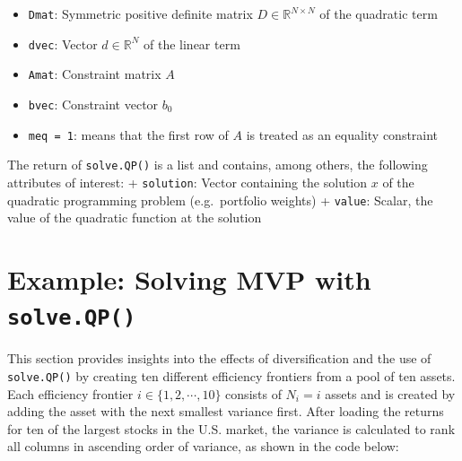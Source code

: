 \documentclass[
  oneside]{book}
\providecommand{\tightlist}{%
  \setlength{\itemsep}{0pt}\setlength{\parskip}{0pt}}
\begin{document}
\vspace{-0.4cm}

\begin{itemize}
\tightlist
\item
  \texttt{Dmat}: Symmetric positive definite matrix \(D \in \mathbb{R}^{N \times N}\) of the quadratic term
\item
  \texttt{dvec}: Vector \(d \in \mathbb{R}^{N}\) of the linear term
\item
  \texttt{Amat}: Constraint matrix \(A\)
\item
  \texttt{bvec}: Constraint vector \(b_0\)
\item
  \texttt{meq\ =\ 1}: means that the first row of \(A\) is treated as an equality constraint
\end{itemize}

The return of \texttt{solve.QP()} is a list and contains, among others, the following attributes of interest:
+ \texttt{solution}: Vector containing the solution \(x\) of the quadratic programming problem (e.g.~portfolio weights)
+ \texttt{value}: Scalar, the value of the quadratic function at the solution

\hypertarget{exampleanalyticalmvp}{%
\section{\texorpdfstring{Example: Solving MVP with \texttt{solve.QP()}}{Example: Solving MVP with solve.QP()}}\label{exampleanalyticalmvp}}

This section provides insights into the effects of diversification and the use of \texttt{solve.QP()} by creating ten different efficiency frontiers from a pool of ten assets. Each efficiency frontier \(i \in \{1, 2, \cdots, 10\}\) consists of \(N_i = i\) assets and is created by adding the asset with the next smallest variance first. After loading the returns for ten of the largest stocks in the U.S. market, the variance is calculated to rank all columns in ascending order of variance, as shown in the code below:
\end{document}

